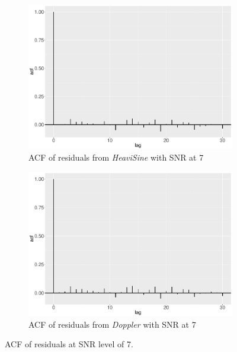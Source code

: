 \begin{figure}
    \begin{subfigure}{0.45\textwidth}
    \centering
    \includegraphics[width=\textwidth]{Chapters/02TractorSplineTheory/plot/ggplot/ggacfHeavi7.pdf}
    \caption{ACF of residuals from \textit{HeaviSine} with SNR at 7 }
    \end{subfigure}
    \begin{subfigure}{0.45\textwidth}
    \centering
    \includegraphics[width=\textwidth]{Chapters/02TractorSplineTheory/plot/ggplot/ggacfDoppler7.pdf}
    \caption{ACF of residuals from \textit{Doppler} with SNR at 7 }
    \end{subfigure}
\caption{ACF of residuals at SNR level of 7.}\label{tractorsplineSNR7acf}
 \end{figure}
